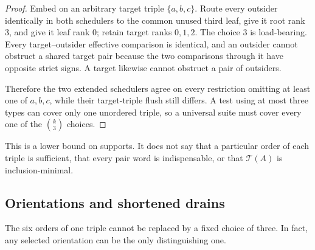 \begin{proof}
Embed  on an arbitrary target triple
\(\{a,b,c\}\).  Route every outsider identically in both schedulers to the
common unused third leaf, give it root rank \(3\), and give it leaf rank \(0\);
retain target ranks \(0,1,2\).  The choice \(3\) is load-bearing.  Every
target--outsider effective comparison is identical, and an outsider cannot
obstruct a shared target pair because the two comparisons through it have
opposite strict signs.  A target likewise cannot obstruct a pair of
outsiders.

Therefore the two extended schedulers agree on every restriction omitting at
least one of \(a,b,c\), while their target-triple flush still differs.  A test
using at most three types can cover only one unordered triple, so a universal
suite must cover every one of the \(\binom{k}{3}\) choices.
\end{proof}

This is a lower bound on supports.  It does not say that a particular order of
each triple is sufficient, that every pair word is indispensable, or that
\(\mathcal T(A)\) is inclusion-minimal.

\subsection{Orientations and shortened drains}

The six orders of one triple cannot be replaced by a fixed choice of three.
In fact, any selected orientation can be the only distinguishing one.


